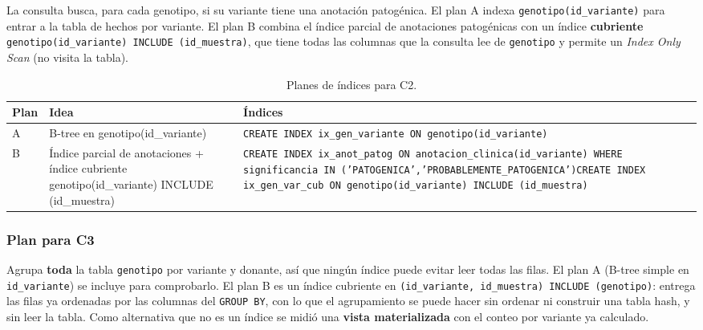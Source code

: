 La consulta busca, para cada genotipo, si su variante tiene una anotación patogénica. El plan A indexa \texttt{genotipo(id\_\allowbreak{}variante)} para entrar a la tabla de hechos por variante. El plan B combina el índice parcial de anotaciones patogénicas con un índice \textbf{cubriente} \texttt{genotipo(id\_\allowbreak{}variante) INCLUDE (id\_\allowbreak{}muestra)}, que tiene todas las columnas que la consulta lee de \texttt{genotipo} y permite un \textit{Index Only Scan} (no visita la tabla).

\begin{table}[H]
\centering\footnotesize
\begin{tabular}{@{}>{\raggedright\arraybackslash}p{0.8cm}>{\raggedright\arraybackslash}p{3.9cm}>{\raggedright\arraybackslash}p{9.4cm}@{}}
\toprule
Plan & Idea & Índices \\
\midrule
A & B-tree en genotipo(id\_variante) & \texttt{CREATE INDEX ix\_\allowbreak{}gen\_\allowbreak{}variante ON genotipo(id\_\allowbreak{}variante)} \\
B & Índice parcial de anotaciones + índice cubriente genotipo(id\_variante) INCLUDE (id\_muestra) & \texttt{CREATE INDEX ix\_\allowbreak{}anot\_\allowbreak{}patog ON anotacion\_\allowbreak{}clinica(id\_\allowbreak{}variante) WHERE significancia IN ('PATOGENICA','PROBABLEMENTE\_\allowbreak{}PATOGENICA')}\newline \texttt{CREATE INDEX ix\_\allowbreak{}gen\_\allowbreak{}var\_\allowbreak{}cub ON genotipo(id\_\allowbreak{}variante) INCLUDE (id\_\allowbreak{}muestra)} \\
\bottomrule
\end{tabular}
\caption{Planes de índices para C2.}
\end{table}
\subsubsection{Plan para C3}

Agrupa \textbf{toda} la tabla \texttt{genotipo} por variante y donante, así que ningún índice puede evitar leer todas las filas. El plan A (B-tree simple en \texttt{id\_\allowbreak{}variante}) se incluye para comprobarlo. El plan B es un índice cubriente en \texttt{(id\_\allowbreak{}variante, id\_\allowbreak{}muestra) INCLUDE (genotipo)}: entrega las filas ya ordenadas por las columnas del \texttt{GROUP BY}, con lo que el agrupamiento se puede hacer sin ordenar ni construir una tabla hash, y sin leer la tabla. Como alternativa que no es un índice se midió una \textbf{vista materializada} con el conteo por variante ya calculado.

